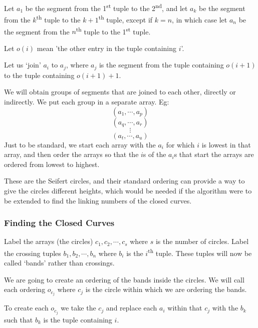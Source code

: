 \documentclass[10pt,a4paper]{report}
\theoremstyle{definition}
\theoremstyle{remark}
\theoremstyle{example}
\begin{document}
 Let $a_1$ be the segment from the 1\textsuperscript{st} tuple to the 2\textsuperscript{nd}, and let $a_k$ be the segment from the ${k}$\textsuperscript{th} tuple to the ${k+1}$\textsuperscript{th} tuple, except if $k=n$, in which case let $a_n$ be the segment from the ${n}$\textsuperscript{th} tuple to the 1\textsuperscript{st} tuple.
 
  Let $o(i)$ mean 'the other entry in the tuple containing $i$'.
  
  Let us `join' $a_i$ to $a_j$, where $a_j$ is the segment from the tuple containing $o(i+1)$ to the tuple containing $o(i+1)+1$.
 
  We will obtain groups of segments that are joined to each other, directly or indirectly. We put each group in a separate array. Eg:
 \begin{equation*}
 (a_1, \cdots, a_p)
 \end{equation*}
 \begin{equation*}
 (a_q, \cdots, a_r)
 \end{equation*}
 \begin{equation*}
 \vdots
 \end{equation*}
 \begin{equation*}
 (a_t, \cdots, a_u)
 \end{equation*}
 Just to be standard, we start each array with the $a_i$ for which $i$ is lowest in that array, and then order the arrays so that the $i$s of the $a_i$s that start the arrays are ordered from lowest to highest. 
 
 These are the Seifert circles, and their standard ordering can provide a way to give the circles different heights, which would be needed if the algorithm were to be extended to find the linking numbers of the closed curves.
 
 \subsubsection{Finding the Closed Curves}
 
 Label the arrays (the circles) $c_1,c_2,\cdots,c_s$ where $s$ is the number of circles. Label the crossing tuples $b_1,b_2,\cdots,b_n$ where $b_i$ is the $i$\textsuperscript{th} tuple. These tuples will now be called `bands' rather than crossings. 
 
 We are going to create an ordering of the bands inside the circles. We will call each ordering $o_{c_j}$ where $c_j$ is the circle within which we are ordering the bands.
 
 To create each $o_{c_j}$ we take the $c_j$ and replace each $a_i$ within that $c_j$ with the $b_k$ such that $b_k$ is the tuple containing $i$.
 
\end{document}
